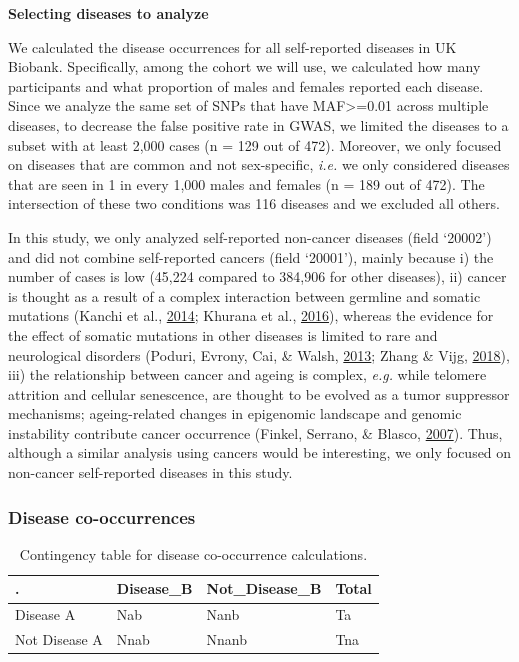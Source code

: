 \documentclass[12pt,twoside]{unicam}
\begin{document}
\textbf{Selecting diseases to analyze}

We calculated the disease occurrences for all self-reported diseases in UK Biobank. Specifically, among the cohort we will use, we calculated how many participants and what proportion of males and females reported each disease. Since we analyze the same set of SNPs that have MAF\textgreater=0.01 across multiple diseases, to decrease the false positive rate in GWAS, we limited the diseases to a subset with at least 2,000 cases (n = 129 out of 472). Moreover, we only focused on diseases that are common and not sex-specific, \emph{i.e.} we only considered diseases that are seen in 1 in every 1,000 males and females (n = 189 out of 472). The intersection of these two conditions was 116 diseases and we excluded all others.

In this study, we only analyzed self-reported non-cancer diseases (field `20002') and did not combine self-reported cancers (field `20001'), mainly because i) the number of cases is low (45,224 compared to 384,906 for other diseases), ii) cancer is thought as a result of a complex interaction between germline and somatic mutations (Kanchi et al., \protect\hyperlink{ref-Kanchi2014}{2014}; Khurana et al., \protect\hyperlink{ref-Khurana2016}{2016}), whereas the evidence for the effect of somatic mutations in other diseases is limited to rare and neurological disorders (Poduri, Evrony, Cai, \& Walsh, \protect\hyperlink{ref-Poduri2013}{2013}; Zhang \& Vijg, \protect\hyperlink{ref-Zhang2018}{2018}), iii) the relationship between cancer and ageing is complex, \emph{e.g.} while telomere attrition and cellular senescence, are thought to be evolved as a tumor suppressor mechanisms; ageing-related changes in epigenomic landscape and genomic instability contribute cancer occurrence (Finkel, Serrano, \& Blasco, \protect\hyperlink{ref-Finkel2007}{2007}). Thus, although a similar analysis using cancers would be interesting, we only focused on non-cancer self-reported diseases in this study.

\hypertarget{disease-co-occurrences-1}{%
\subsubsection{Disease co-occurrences}\label{disease-co-occurrences-1}}

\begingroup\fontsize{12}{14}\selectfont

\begin{longtable}[t]{llll}
\caption{\label{tab:discooccurTable}Contingency table for disease co-occurrence calculations.}\\
\toprule
. & Disease\_B & Not\_Disease\_B & Total\\
\midrule
Disease A & Nab & Nanb & Ta\\
Not Disease A & Nnab & Nnanb & Tna\\
\bottomrule
\end{longtable}
\endgroup{}
\end{document}
